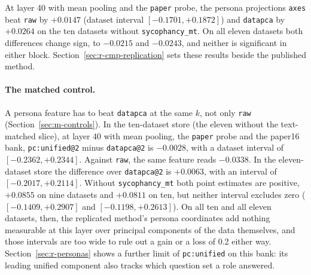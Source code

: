 At layer 40 with mean pooling and the \texttt{paper} probe, the persona projections \texttt{axes} beat \texttt{raw} by $+0.0147$ (dataset interval $[-0.1701, +0.1872]$) and \texttt{datapca} by $+0.0264$ on the ten datasets without \texttt{sycophancy\_mt}. %
On all eleven datasets both differences change sign, to $-0.0215$ and $-0.0243$, and neither is significant in either block. %
Section~\ref{sec:r-cmp-replication} sets these results beside the published method.

\paragraph{The matched control.}
A persona feature has to beat \texttt{datapca} at the same $k$, not only \texttt{raw} (Section~\ref{sec:m-controls}).
In the ten-dataset store (the eleven without the text-matched slice), at layer 40 with mean pooling, the \texttt{paper} probe and the paper16 bank, \texttt{pc:unified@2} minus \texttt{datapca@2} is $-0.0028$, with a dataset interval of $[-0.2362, +0.2344]$. %
Against \texttt{raw}, the same feature reads $-0.0338$. %
In the eleven-dataset store the difference over \texttt{datapca@2} is $+0.0063$, with an interval of $[-0.2017, +0.2114]$. %
Without \texttt{sycophancy\_mt} both point estimates are positive, $+0.0855$ on nine datasets and $+0.0811$ on ten, but neither interval excludes zero ($[-0.1409, +0.2907]$ and $[-0.1198, +0.2613]$). %
On all ten and all eleven datasets, then, the replicated method's persona coordinates add nothing measurable at this layer over principal components of the data themselves, and those intervals are too wide to rule out a gain or a loss of 0.2 either way. %
Section~\ref{sec:r-personas} shows a further limit of \texttt{pc:unified} on this bank: its leading unified component also tracks which question set a role answered. %

